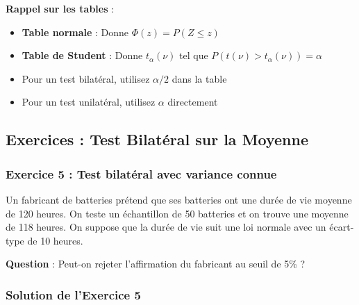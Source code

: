 \documentclass[11pt,a4paper]{article}
\begin{document}
\begin{rappelbox}
\textbf{Rappel sur les tables} :
\begin{itemize}
    \item \textbf{Table normale} : Donne $\Phi(z) = P(Z \leq z)$
    \item \textbf{Table de Student} : Donne $t_{\alpha}(\nu)$ tel que $P(t(\nu) > t_{\alpha}(\nu)) = \alpha$
    \item Pour un test bilatéral, utilisez $\alpha/2$ dans la table
    \item Pour un test unilatéral, utilisez $\alpha$ directement
\end{itemize}
\end{rappelbox}

\newpage

\subsection{Exercices : Test Bilatéral sur la Moyenne}

\subsubsection{Exercice 5 : Test bilatéral avec variance connue}

Un fabricant de batteries prétend que ses batteries ont une durée de vie moyenne de 120 heures. On teste un échantillon de 50 batteries et on trouve une moyenne de 118 heures. On suppose que la durée de vie suit une loi normale avec un écart-type de 10 heures.

\textbf{Question} : Peut-on rejeter l'affirmation du fabricant au seuil de 5\% ?

\subsubsection*{Solution de l'Exercice 5}
\end{document}
